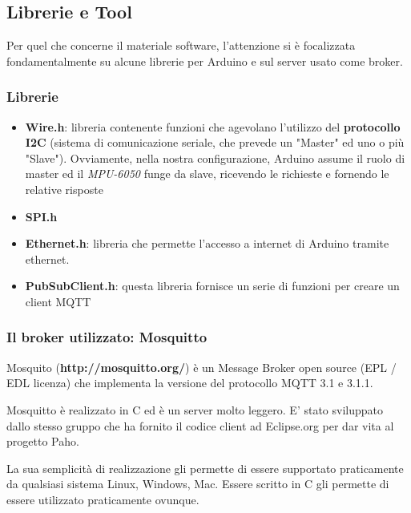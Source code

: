 \documentclass[]{scrartcl}
\begin{document}
\subsection{Librerie e Tool}
Per quel che concerne il materiale software, l'attenzione si è focalizzata fondamentalmente su alcune librerie per Arduino e sul server usato come broker.

\subsubsection{Librerie} 
\begin{itemize}
	\item \textbf{Wire.h}: libreria contenente funzioni che agevolano l’utilizzo del \textbf{protocollo I2C} (sistema di comunicazione seriale, che prevede un "Master"  ed uno o più "Slave"). Ovviamente, nella nostra configurazione, Arduino assume il ruolo di master ed il \emph{MPU-6050} funge da slave, ricevendo le richieste e fornendo le relative risposte
	\item \textbf{SPI.h}
	\item \textbf{Ethernet.h}: libreria che permette l'accesso a internet di Arduino tramite ethernet.
	\item \textbf{PubSubClient.h}: questa libreria fornisce un serie di funzioni per creare un client MQTT
\end{itemize}

\subsubsection{Il broker utilizzato: Mosquitto}
Mosquito (\textbf{http://mosquitto.org/}) è un Message Broker open source (EPL / EDL licenza) che implementa la versione del protocollo MQTT 3.1 e 3.1.1.

Mosquitto è realizzato in C ed è un server molto leggero. E' stato sviluppato dallo stesso gruppo che ha fornito il codice client ad Eclipse.org per dar vita al progetto Paho.

La sua semplicità di realizzazione gli permette di essere supportato praticamente da qualsiasi sistema Linux, Windows, Mac. Essere scritto in C gli permette di essere utilizzato praticamente ovunque.
\newpage
\end{document}
